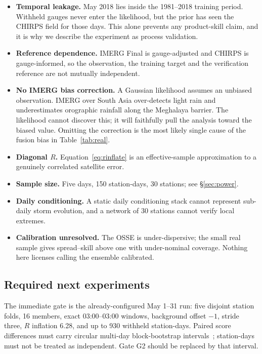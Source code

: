 \documentclass[10pt,twocolumn]{article}
\begin{document}
\begin{itemize}
\item \textbf{Temporal leakage.} May 2018 lies inside the 1981--2018 training
period. Withheld gauges never enter the likelihood, but the prior has seen the
CHIRPS field for those days. This alone prevents any product-skill claim, and
it is why we describe the experiment as process validation.
\item \textbf{Reference dependence.} IMERG Final is gauge-adjusted and CHIRPS
is gauge-informed, so the observation, the training target and the verification
reference are not mutually independent.
\item \textbf{No IMERG bias correction.} A Gaussian likelihood assumes an
unbiased observation. IMERG over South Asia over-detects light rain and
underestimates orographic rainfall along the Meghalaya barrier. The likelihood
cannot discover this; it will faithfully pull the analysis toward the biased
value. Omitting the correction is the most likely single cause of the fusion
bias in Table~\ref{tab:real}.
\item \textbf{Diagonal $R$.} Equation~\eqref{eq:rinflate} is an
effective-sample approximation to a genuinely correlated satellite error.
\item \textbf{Sample size.} Five days, 150 station-days, 30 stations; see
\S\ref{sec:power}.
\item \textbf{Daily conditioning.} A static daily conditioning stack cannot
represent sub-daily storm evolution, and a network of 30 stations cannot verify
local extremes.
\item \textbf{Calibration unresolved.} The OSSE is under-dispersive; the small
real sample gives spread--skill above one with under-nominal coverage. Nothing
here licenses calling the ensemble calibrated.
\end{itemize}

\subsection{Required next experiments}

The immediate gate is the already-configured May 1--31 run: five disjoint
station folds, 16 members, exact 03:00--03:00 windows, background offset $-1$,
stride three, $R$ inflation 6.28, and up to 930 withheld station-days. Paired
score differences must carry circular multi-day block-bootstrap
intervals~\cite{politis1994}; station-days must not be treated as independent.
Gate G2 should be replaced by that interval.
\end{document}
